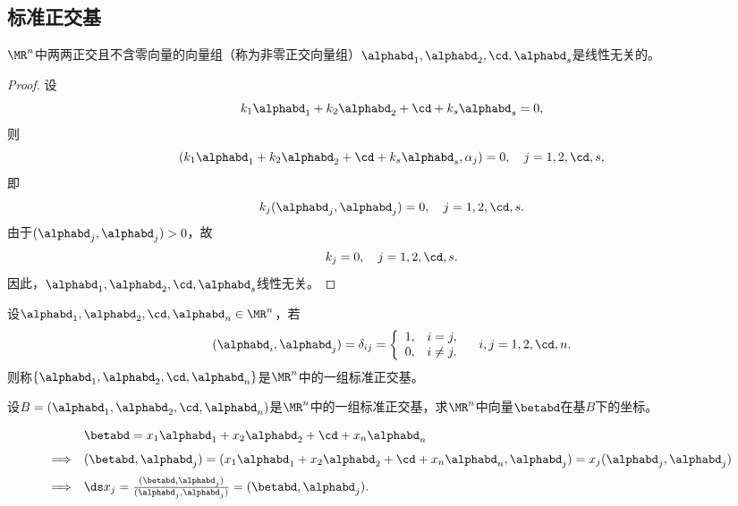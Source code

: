 \subsection{标准正交基}

\begin{frame}  
  \begin{dingli}
    $\MR^n$中两两正交且不含零向量的向量组（称为非零正交向量组）$\alphabd_1,\alphabd_2,\cd,\alphabd_s$是线性无关的。
  \end{dingli}
  \pause
  \begin{proof}
    设
    $$
    k_1\alphabd_1+k_2\alphabd_2+\cd+k_s\alphabd_s=0,
    $$
    则
    $$
    (k_1\alphabd_1+k_2\alphabd_2+\cd+k_s\alphabd_s,\alpha_j)=0, \quad j=1,2,\cd,s,
    $$
    即
    $$
    k_j(\alphabd_j,\alphabd_j)=0, \quad j=1,2,\cd,s.
    $$
    由于$(\alphabd_j,\alphabd_j)>0$，故
    $$
    k_j=0, \quad j=1,2,\cd,s.
    $$
    因此，$\alphabd_1,\alphabd_2,\cd,\alphabd_s$线性无关。
  \end{proof}  
\end{frame}


\begin{frame}
  
  \begin{dingyi}[标准正交基]
    设$\alphabd_1,\alphabd_2,\cd,\alphabd_n\in \MR^n$，若
    $$
    (\alphabd_i,\alphabd_j)=\delta_{ij}=\left\{
      \begin{array}{ll}
        1,& i=j,\\
        0,& i\ne j.
      \end{array}
    \right. \quad i,j=1,2,\cd,n.
    $$
    则称$\{\alphabd_1,\alphabd_2,\cd,\alphabd_n\}$是$\MR^n$中的一组标准正交基。
  \end{dingyi}
  
\end{frame}


\begin{frame}
  
  \begin{li}
    设$B=(\alphabd_1,\alphabd_2,\cd,\alphabd_n)$是$\MR^n$中的一组标准正交基，求$\MR^n$中向量$\betabd$在基$B$下的坐标。
  \end{li}
  \pause
  \begin{jie}
    $$
    \begin{array}{rl}
      & \betabd=x_1\alphabd_1+x_2\alphabd_2+\cd+x_n\alphabd_n\\[0.1in]
      \Longrightarrow&   (\betabd,\alphabd_j)=(x_1\alphabd_1+x_2\alphabd_2+\cd+x_n\alphabd_n,\alphabd_j)=x_j(\alphabd_j,\alphabd_j)\\[0.1in]
      \Longrightarrow& \ds x_j =\frac{ (\betabd,\alphabd_j)}{(\alphabd_j,\alphabd_j)} = (\betabd,\alphabd_j).
    \end{array}
    $$
  \end{jie}  
  
\end{frame}

